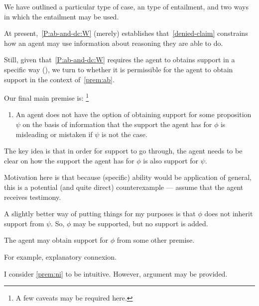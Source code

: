 \begin{note}
  We have outlined a particular type of case, an type of entailment, and two ways in which the entailment may be used.

  At present,~\ref{P:ab-and-dc:W} (merely) establishes that~\ref{denied-claim} constrains how an agent may use information about reasoning they are able to do.
  

  Still, given that~\ref{P:ab-and-dc:W} requires the agent to obtains support in a specific way (\AR{}), we turn to whether it is permissible for the agent to obtain support in the context of~\ref{prem:ab}.
\end{note}

\begin{note}[Inertia]
  Our final main premise is:\nolinebreak
  \footnote{
    A few caveats may be required here.
  }
  \begin{enumerate}[label=\nI{}, ref=\nI{}]
  \item\label{prem:ni} An agent does not have the option of obtaining support for some proposition \(\psi\) on the basis of information that the support the agent has for \(\phi\) is misleading or mistaken if \(\psi\) is not the case.
  \end{enumerate}

  The key idea is that in order for support to go through, the agent needs to be clear on how the support the agent has for \(\phi\) is also support for \(\psi\).

  {
    \color{green}
    Motivation here is that because (specific) ability would be application of general, this is a potential (and quite direct) counterexample --- assume that the agent receives testimony.
  }

  {
    \color{red}
    A slightly better way of putting things for my purposes is that \(\phi\) does not inherit support from \(\psi\).
    So, \(\phi\) may be supported, but no support is added.
  }

  {
    \color{red}
    The agent may obtain support for \(\phi\) from some other premise.
  }

  For example, explanatory connexion.


  I consider \ref{prem:ni} to be intuitive.
  However, argument may be provided.
\end{note}

